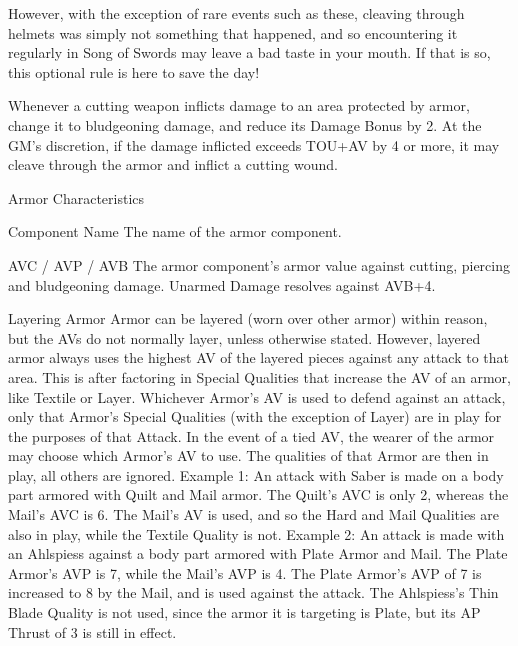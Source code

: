\documentclass[oneside,11pt,english]{book}
\begin{document}
 

However, with the exception of rare events such as these, cleaving through helmets was simply not 
something that happened, and so encountering it regularly in Song of Swords may leave a bad taste in 
your mouth. If that is so, this optional rule is here to save the day! 

 

Whenever a cutting weapon inflicts damage to an area protected by armor, change it to bludgeoning 
damage, and reduce its Damage Bonus by 2. At the GM’s discretion, if the damage inflicted exceeds 
TOU+AV by 4 or more, it may cleave through the armor and inflict a cutting wound. 

 

Armor Characteristics 

 

Component Name 
The name of the armor component. 

 

AVC / AVP / AVB 
The armor component’s armor value against cutting, piercing and bludgeoning damage. Unarmed 
Damage resolves against AVB+4. 

 


Layering Armor 
Armor can be layered (worn over other armor) within reason, but the AVs do not normally layer, unless 
otherwise stated. However, layered armor always uses the highest AV of the layered pieces against any 
attack to that area. This is after factoring in Special Qualities that increase the AV of an armor, like 
Textile or Layer. 
Whichever Armor’s AV is used to defend against an attack, only that Armor’s Special Qualities (with the 
exception of Layer) are in play for the purposes of that Attack. In the event of a tied AV, the wearer of the 
armor may choose which Armor’s AV to use. The qualities of that Armor are then in play, all others are 
ignored. 
Example 1: An attack with Saber is made on a body part armored with Quilt and Mail armor. The Quilt’s 
AVC is only 2, whereas the Mail’s AVC is 6. The Mail’s AV is used, and so the Hard and Mail Qualities 
are also in play, while the Textile Quality is not. 
Example 2: An attack is made with an Ahlspiess against a body part armored with Plate Armor and Mail. 
The Plate Armor’s AVP is 7, while the Mail’s AVP is 4. The Plate Armor’s AVP of 7 is increased to 8 by 
the Mail, and is used against the attack. The Ahlspiess’s Thin Blade Quality is not used, since the armor it 
is targeting is Plate, but its AP Thrust of 3 is still in effect. 

 
\end{document}
